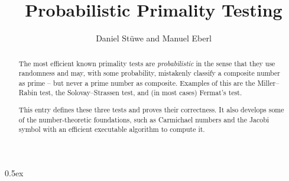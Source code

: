 \documentclass[11pt,a4paper]{article}
\begin{document}
\title{Probabilistic Primality Testing}
\author{Daniel Stüwe and Manuel Eberl}
\maketitle

\begin{abstract}
The most efficient known primality tests are \emph{probabilistic} in the sense that they use randomness and may, with some probability, mistakenly classify a composite number as prime -- but never a prime number as composite. Examples of this are the Miller--Rabin test, the Solovay--Strassen test, and (in most cases) Fermat's test. 

This entry defines these three tests and proves their correctness. It also develops some of the number-theoretic foundations, such as Carmichael numbers and the Jacobi symbol with an efficient executable algorithm to compute it.
\end{abstract}

\newpage
\tableofcontents
\newpage
\parindent 0pt\parskip 0.5ex





\end{document}
